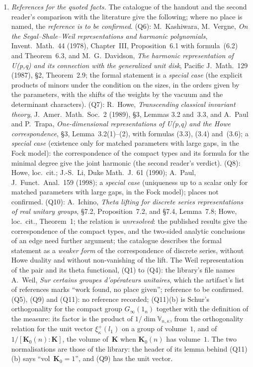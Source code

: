 \documentclass[11pt,a4paper]{article}
\newcommand{\m}[1]{\mbox{$#1$}}        %
\theoremstyle{plainx}
\theoremstyle{uprightx}
\newcommand{\Ginf}[1]{G_{\infty}(#1)}
\newcommand{\Kz}[1]{\mathbf{K}_{0}(#1)}
\newcommand{\one}[1]{1_{#1}}
\newcommand{\Vk}[2]{\mathbb{V}_{#1,#2}}
\newcommand{\vplus}[2]{\xi^{+}_{#1}(#2)}
\begin{document}
\begin{enumerate}[label=\textup{\arabic*.},leftmargin=1.6em,itemsep=5pt]
because edges are defined with theta lifts.
\item \emph{References for the quoted facts.} The catalogue of the handout and the second reader's comparison
with the literature give the following; where no place is named, the \emph{reference is to be confirmed}.
(Q6): M.~Kashiwara, M.~Vergne, \emph{On the Segal--Shale--Weil representations and harmonic polynomials},
Invent.~Math.~44 (1978), Chapter~III, Proposition~6.1 with formula~(6.2) and Theorem~6.3, and M.~G.~Davidson,
\emph{The harmonic representation of U(p,q) and its connection with the generalized unit disk}, Pacific
J.~Math.~129 (1987), §2, Theorem~2.9; the formal statement is a \emph{special case} (the explicit products of
minors under the condition on the sizes, in the orders given by the parameters, with the shifts of the weights
by the vacuum and the determinant characters). (Q7): R.~Howe, \emph{Transcending classical invariant theory},
J.~Amer.~Math.~Soc.~2 (1989), §3, Lemmas 3.2 and~3.3, and A.~Paul and P.~Trapa, \emph{One-dimensional
representations of U(p,q) and the Howe correspondence}, §3, Lemma~3.2(1)--(2), with formulas (3.3), (3.4)
and~(3.6); a \emph{special case} (existence only for matched parameters with large gaps, in the Fock model): the
correspondence of the compact types and its formula for the minimal degree give the joint harmonic (the second
reader's verdict). (Q8): Howe, loc.~cit.; J.-S.~Li, Duke Math.~J.~61 (1990); A.~Paul, J.~Funct.~Anal.~159 (1998); a
\emph{special case} (uniqueness up to a scalar only for matched parameters with large gaps, in the Fock model);
places not confirmed. (Q10): A.~Ichino, \emph{Theta lifting for discrete series
representations of real unitary groups}, §7.2, Proposition~7.2, and §7.4, Lemma~7.8; Howe, loc.~cit., Theorem~1;
the relation is \emph{unresolved}: the published results give the correspondence of the compact types, and the
two-sided analytic conclusions of an edge need further argument; the catalogue describes the formal statement
as a \emph{weaker form} of the correspondence of discrete series, without Howe duality and without
non-vanishing of the lift. The Weil representation of the pair and its theta functional, (Q1) to (Q4): the
library's file names A.~Weil, \emph{Sur certains groupes d'opérateurs unitaires}, which the artifact's list of
references marks ``work found, no place given''; reference to be confirmed. (Q5), (Q9) and (Q11): no reference
recorded; (Q11)(b) is Schur's orthogonality for the compact group \m{\Ginf{\one{n}}} together with the definition of
the measure: its factor is the product of \m{1/\dim\Vk{n}{\kappa}}, from the orthogonality relation for the unit
vector \m{\vplus{\kappa}{l_{1}}} on a group of volume~$1$, and of \m{1/[\Kz{n}:\mathbf{K}]}, the volume
of~$\mathbf{K}$ when \m{\Kz{n}} has volume~$1$. The two normalisations are those of the library: the header of its
lemma behind (Q11)(b) says ``vol~$\mathbf{K}_{0}=1$'', and (Q9) has the unit vector.
\end{enumerate}
\end{document}
